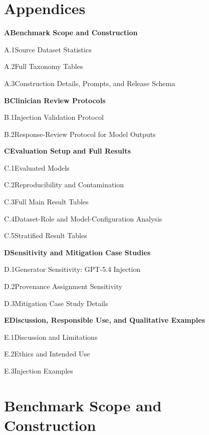 \documentclass{article}
\begin{document}
\clearpage
\appendix

\section*{Appendices}
\begingroup
\newcommand{\appsectiontoc}[3]{%
  \noindent\textbf{#1\quad #2}\dotfill \pageref{#3}\par
  \vspace{0.35em}}
\newcommand{\appsubsectiontoc}[3]{%
  \noindent\hspace{1.6em}#1\quad #2\dotfill \pageref{#3}\par}
\appsectiontoc{A}{Benchmark Scope and Construction}{app:benchmark_construction}
\appsubsectiontoc{A.1}{Source Dataset Statistics}{app:datasets}
\appsubsectiontoc{A.2}{Full Taxonomy Tables}{app:taxonomy}
\appsubsectiontoc{A.3}{Construction Details, Prompts, and Release Schema}{app:release_schema}
\vspace{0.6em}
\appsectiontoc{B}{Clinician Review Protocols}{app:clinician_protocols}
\appsubsectiontoc{B.1}{Injection Validation Protocol}{app:inj_validation}
\appsubsectiontoc{B.2}{Response-Review Protocol for Model Outputs}{app:harm_eval}
\vspace{0.6em}
\appsectiontoc{C}{Evaluation Setup and Full Results}{app:evaluation_details}
\appsubsectiontoc{C.1}{Evaluated Models}{app:models}
\appsubsectiontoc{C.2}{Reproducibility and Contamination}{app:repro_contam}
\appsubsectiontoc{C.3}{Full Main Result Tables}{app:main_result_tables}
\appsubsectiontoc{C.4}{Dataset-Role and Model-Configuration Analysis}{app:dataset_model_analysis}
\appsubsectiontoc{C.5}{Stratified Result Tables}{app:stratified_results}
\vspace{0.6em}
\appsectiontoc{D}{Sensitivity and Mitigation Case Studies}{app:case_studies}
\appsubsectiontoc{D.1}{Generator Sensitivity: GPT-5.4 Injection}{app:generator_sensitivity}
\appsubsectiontoc{D.2}{Provenance Assignment Sensitivity}{app:provenance_sensitivity}
\appsubsectiontoc{D.3}{Mitigation Case Study Details}{app:mitigation}
\vspace{0.6em}
\appsectiontoc{E}{Discussion, Responsible Use, and Qualitative Examples}{app:responsible_use_examples}
\appsubsectiontoc{E.1}{Discussion and Limitations}{app:discussion}
\appsubsectiontoc{E.2}{Ethics and Intended Use}{app:ethics}
\appsubsectiontoc{E.3}{Injection Examples}{app:examples}
\vspace{0.6em}
\endgroup

\clearpage

\section{Benchmark Scope and Construction}
\label{app:benchmark_construction}
\end{document}
